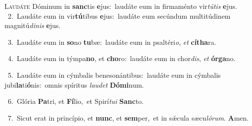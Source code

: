 \lettrine{\initial\textcolor{\initialcolor}{L}}{audáte} Dóminum in \textbf{sanc}\-tis \textbf{e}\-jus:~\star laudáte eum in firmaménto vir\-\textit{tú}\-\textit{tis} \textbf{e}\-jus.\\
{\numbfont\textcolor{\numbcolor}{~2.}}~Laudáte eum in vir\-\textbf{tú}\-tibus \textbf{e}\-jus:~\star laudáte eum secúndum multitúdinem magnitú\-\textit{di}\-\textit{nis} \textbf{e}\-jus.\par
{\numbfont\textcolor{\numbcolor}{~3.}}~Laudáte eum in \textbf{so}\-no \textbf{tu}\-bæ:~\star laudáte eum in psaltéri\-\textit{o}\-, \textit{et} \textbf{cí}\-\textbf{tha}ra.\par
{\numbfont\textcolor{\numbcolor}{~4.}}~Laudáte eum in týmpa\-\textbf{no}\-, et \textbf{cho}\-ro:~\star laudáte eum in chor\-\textit{dis}\-, \textit{et} \textbf{ór}\-\textbf{ga}no.\par
{\numbfont\textcolor{\numbcolor}{~5.}}~Laudáte eum in cýmbalis benesonántibus:~\dagger laudáte eum in cýmbalis jubi\-\textbf{la}\-ti\-\textbf{ó}\-nis:~\star omnis spíritus \textit{lau}\-\textit{det} \textbf{Dó}\-\textbf{mi}num.\par
{\numbfont\textcolor{\numbcolor}{~6.}}~Glória \textbf{Pa}\-tri, et \textbf{Fí}\-lio,~\star et Spirí\-\textit{tu}\-\textit{i} \textbf{Sanc}\-to.\par
{\numbfont\textcolor{\numbcolor}{~7.}}~Sicut erat in princípio, et \textbf{nunc}\-, et \textbf{sem}\-per,~\star et in sǽcula sæcu\-\textit{ló}\-\textit{rum}. \textbf{A}\-men.\par
